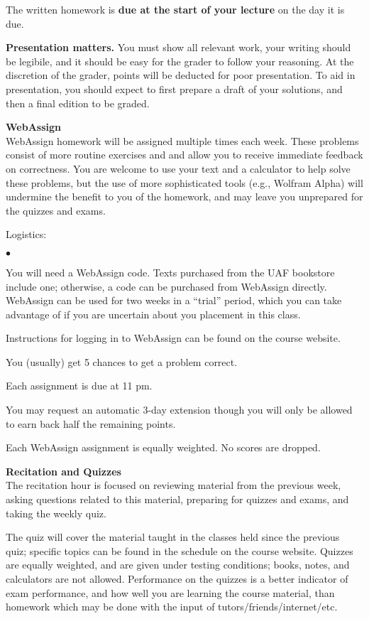 \documentclass[12pt]{article}
\renewcommand{\emph}[1]{\textsf{\textbf{#1}}}
\newcommand{\localhead}[1]{\par\smallskip\textbf{#1}\nobreak\\}%
\def\heading#1{\localhead{\large\emph{#1}}}
\def\subheading#1{\localhead{\emph{#1}}}
\newenvironment{clist}%
{\bgroup\parskip 0pt\begin{list}{$\bullet$}{\partopsep 4pt\topsep 0pt\itemsep -2pt}}%
{\end{list}\egroup}%
\begin{document}
The written homework is \textbf{due at the start of your lecture} 
on the day it is due.

\textbf{Presentation matters.} You must show all relevant work, your writing
should be legibile, and it should be easy for the grader to follow
your reasoning. At the discretion of the grader, points will be deducted 
for poor presentation.  To aid in presentation, you should expect
to first prepare a draft of your solutions, and then a final edition to
be graded.

\subheading{WebAssign} 
WebAssign homework will be assigned multiple times each week. These problems consist of more routine exercises and and allow
you to receive immediate feedback on correctness.  You are welcome
to use your text and a calculator to help solve these problems, but
the use of more sophisticated tools (e.g., Wolfram Alpha) will undermine
the benefit to you of the homework, and may leave you unprepared for
the quizzes and exams.

Logistics:

\begin{clist}
\item You will need a WebAssign code.  Texts purchased from the UAF 
bookstore include one; otherwise, a code can be purchased from
WebAssign directly. WebAssign can be used for two weeks in a ``trial''
period, which you can take advantage of if you are uncertain about
you placement in this class.
\item Instructions for logging in to WebAssign can be found on the course website.
\item You (usually) get 5 chances to get a problem correct. 
\item Each assignment is due at 11 pm. 
\item You may request an automatic 3-day extension though you will only be allowed to earn back half the remaining points. 
\item Each WebAssign assignment is equally weighted. No scores are dropped.
\end{clist}

\heading{Recitation and Quizzes}
The recitation hour is focused on reviewing material from the previous week, asking questions related to this material, preparing for quizzes and exams, and taking the weekly quiz.

The quiz will cover the material taught in the classes held since the previous quiz; specific topics can be found in the schedule on the course website.  Quizzes are equally weighted, and are given under testing conditions; books, notes, and calculators are not allowed.  Performance on the quizzes is a better indicator of exam performance, and how well you are learning the course material, than homework which may be done with the input of tutors/friends/internet/etc.
\end{document}
